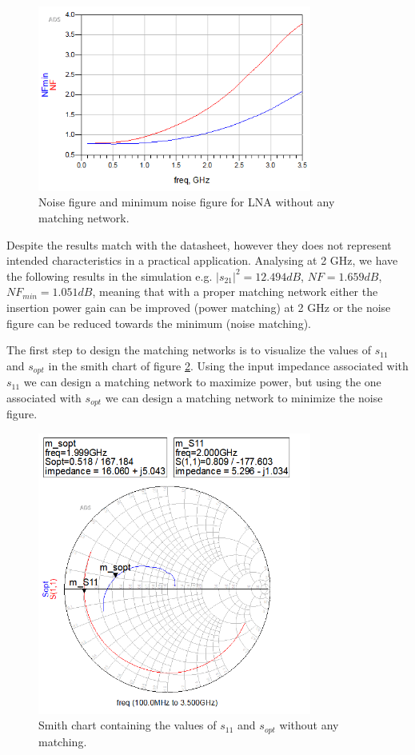 \begin{figure}[H] 
\centering
\includegraphics[width=9cm]{images/nf_nomatch.png}
\caption{Noise figure and minimum noise figure for LNA without any matching network.}
\label{fig:lna2} 
\end{figure}



Despite the results match with the datasheet, however they does not represent intended characteristics in a practical application. Analysing at 2 GHz, we have the following results in the simulation e.g. $|s_{21}|^2 = 12.494 dB$, $NF = 1.659 dB$, $NF_{min} = 1.051 dB$, meaning that with a proper matching network either the insertion power gain can be improved (power matching) at 2 GHz or the noise figure can be reduced towards the minimum (noise matching). 

The first step to design the matching networks is to visualize the values of $s_{11}$ and $s_{opt}$ in the smith chart of figure \ref{smith:1}. Using the input impedance associated with $s_{11}$ we can design a matching network to maximize power, but using the one associated with $s_{opt}$ we can design a matching network to minimize the noise figure. 

\begin{figure}[H] 
\centering
\includegraphics[width=9cm]{images/smith1.png}
\caption{Smith chart containing the values of $s_{11}$ and $s_{opt}$ without any matching.}
\label{smith:1} 
\end{figure}

